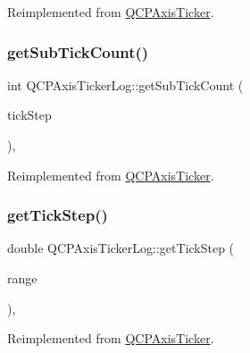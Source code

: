 Reimplemented from \hyperlink{class_q_c_p_axis_ticker_af4645a824c7bd2ca8fc7e86ebf9055bd}{Q\+C\+P\+Axis\+Ticker}.

\mbox{\label{class_q_c_p_axis_ticker_log_a352fef7ae68837acd26e35188aa86167}} 
\subsubsection{\texorpdfstring{get\+Sub\+Tick\+Count()}{getSubTickCount()}}
{\footnotesize\ttfamily int Q\+C\+P\+Axis\+Ticker\+Log\+::get\+Sub\+Tick\+Count (\begin{DoxyParamCaption}\item[{double}]{tick\+Step }\end{DoxyParamCaption})\hspace{0.3cm}{\ttfamily [protected]}, {\ttfamily [virtual]}}



Reimplemented from \hyperlink{class_q_c_p_axis_ticker_a4ccc403ced7a1457ce6ba293509933c8}{Q\+C\+P\+Axis\+Ticker}.

\mbox{\label{class_q_c_p_axis_ticker_log_a57be974214a065d3247406331f02fa49}} 
\subsubsection{\texorpdfstring{get\+Tick\+Step()}{getTickStep()}}
{\footnotesize\ttfamily double Q\+C\+P\+Axis\+Ticker\+Log\+::get\+Tick\+Step (\begin{DoxyParamCaption}\item[{const \hyperlink{class_q_c_p_range}{Q\+C\+P\+Range} \&}]{range }\end{DoxyParamCaption})\hspace{0.3cm}{\ttfamily [protected]}, {\ttfamily [virtual]}}



Reimplemented from \hyperlink{class_q_c_p_axis_ticker_a910d69bcec2de37e92d8d4e1ecf201e2}{Q\+C\+P\+Axis\+Ticker}.

